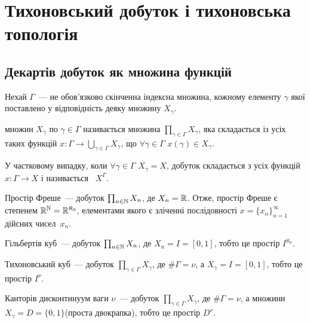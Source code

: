 \newcommand{\CartesianProduct}[1]{\prod_{\gamma\in\Gamma}{#1}_\gamma}
\newcommand{\CartesianNeighbourhood}[1]{U_{K,\{V_\gamma\}_{\gamma\in K}}(#1)}

\chapter{Тихоновський добуток і тихоновська топологія}

\section{Декартів добуток як множина функцій}

Нехай $\Gamma$~--- не обов'язково скінченна індексна множина, кожному елементу $\gamma$ якої поставлено у відповідність деяку множину $X_\gamma$.

\begin{definition}
     множин $X_\gamma$ по $\gamma \in \Gamma$ називається множина $\CartesianProduct{X}$, яка складається із усіх таких функцій $x: \Gamma \to \bigcup_{\gamma \in \Gamma} X_\gamma$, що $\forall \gamma \in \Gamma$ $x(\gamma) \in X_\gamma$.
\end{definition}

\begin{remark}
    У частковому випадку, коли $\forall \gamma \in \Gamma$ $X_\gamma = X$, добуток складається з усіх функцій $x: \Gamma \to X$ і називається ~$X^\Gamma$.
\end{remark}

\begin{example}
    Простір Фреше~--- добуток $\prod_{n \in \mathbb{N}} X_n$, де $X_n = \mathbb{R}$. Отже, простір Фреше є степенем $\mathbb{R}^{\mathbb{N}} = \mathbb{R}^{\aleph_0}$, елементами якого є зліченні послідовності $x = \{x_n\}_{n = 1}^\infty$ дійсних чисел~$x_n$.
\end{example}

\begin{example}
    Гільбертів куб~--- добуток $\prod_{n \in \mathbb{N}} X_n$, де $X_n = I = [0, 1]$, тобто це простір $I^{\aleph_0}$.
\end{example}

\begin{example}
    Тихоновський куб~--- добуток $\CartesianProduct{X}$, де $\# \Gamma = \nu$, а $X_\gamma = I = [0, 1]$, тобто це простір $I^\nu$.
\end{example}

\begin{example}
    Канторів дисконтинуум ваги $\nu$~--- добуток $\CartesianProduct{X}$, де $\#\Gamma = \nu$, а множини $X_\gamma = D = \{0, 1\}$(проста двокрапка), тобто це простір $D^\nu$.
\end{example}

